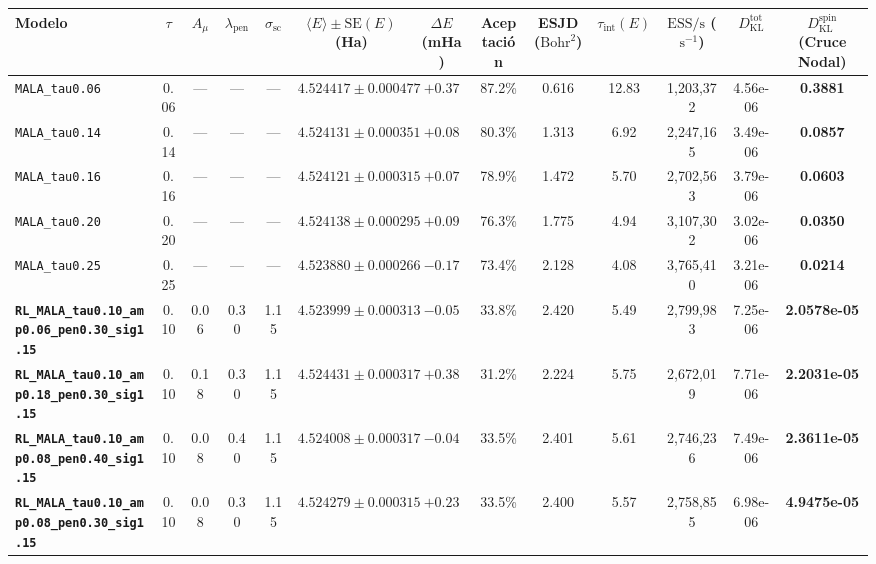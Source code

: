 \documentclass[10pt,a4paper]{article}
\begin{document}
\begin{table}[H]
\centering
\begin{adjustbox}{max width=\textwidth}
\begin{tabular}{lcccccccccccc}
\toprule
\textbf{Modelo} & \textbf{$\tau$} & \textbf{$A_\mu$} & \textbf{$\lambda_{\mathrm{pen}}$} & \textbf{$\sigma_{\mathrm{sc}}$} & \textbf{$\langle E \rangle \pm \mathrm{SE}(E)$ (Ha)} & \textbf{$\Delta E$ (mHa)} & \textbf{Aceptación} & \textbf{ESJD ($\text{Bohr}^2$)} & \textbf{$\tau_{\mathrm{int}}(E)$} & \textbf{$\mathrm{ESS/s}$ ($\text{s}^{-1}$)} & \textbf{$D_{\mathrm{KL}}^{\mathrm{tot}}$} & \textbf{$D_{\mathrm{KL}}^{\mathrm{spin}}$ (Cruce Nodal)} \\
\midrule
\texttt{MALA\_tau0.06} & 0.06 & --- & --- & --- & $4.524417 \pm 0.000477$ & $+0.37$ & 87.2\% & 0.616 & 12.83 & 1,203,372 & 4.56e-06 & \textbf{0.3881} \\
\texttt{MALA\_tau0.14} & 0.14 & --- & --- & --- & $4.524131 \pm 0.000351$ & $+0.08$ & 80.3\% & 1.313 & 6.92 & 2,247,165 & 3.49e-06 & \textbf{0.0857} \\
\texttt{MALA\_tau0.16} & 0.16 & --- & --- & --- & $4.524121 \pm 0.000315$ & $+0.07$ & 78.9\% & 1.472 & 5.70 & 2,702,563 & 3.79e-06 & \textbf{0.0603} \\
\texttt{MALA\_tau0.20} & 0.20 & --- & --- & --- & $4.524138 \pm 0.000295$ & $+0.09$ & 76.3\% & 1.775 & 4.94 & 3,107,302 & 3.02e-06 & \textbf{0.0350} \\
\texttt{MALA\_tau0.25} & 0.25 & --- & --- & --- & $4.523880 \pm 0.000266$ & $-0.17$ & 73.4\% & 2.128 & 4.08 & 3,765,410 & 3.21e-06 & \textbf{0.0214} \\
\textbf{\texttt{RL\_MALA\_tau0.10\_amp0.06\_pen0.30\_sig1.15}} & 0.10 & 0.06 & 0.30 & 1.15 & $4.523999 \pm 0.000313$ & $-0.05$ & 33.8\% & 2.420 & 5.49 & 2,799,983 & 7.25e-06 & \textbf{2.0578e-05} \\
\textbf{\texttt{RL\_MALA\_tau0.10\_amp0.18\_pen0.30\_sig1.15}} & 0.10 & 0.18 & 0.30 & 1.15 & $4.524431 \pm 0.000317$ & $+0.38$ & 31.2\% & 2.224 & 5.75 & 2,672,019 & 7.71e-06 & \textbf{2.2031e-05} \\
\textbf{\texttt{RL\_MALA\_tau0.10\_amp0.08\_pen0.40\_sig1.15}} & 0.10 & 0.08 & 0.40 & 1.15 & $4.524008 \pm 0.000317$ & $-0.04$ & 33.5\% & 2.401 & 5.61 & 2,746,236 & 7.49e-06 & \textbf{2.3611e-05} \\
\textbf{\texttt{RL\_MALA\_tau0.10\_amp0.08\_pen0.30\_sig1.15}} & 0.10 & 0.08 & 0.30 & 1.15 & $4.524279 \pm 0.000315$ & $+0.23$ & 33.5\% & 2.400 & 5.57 & 2,758,855 & 6.98e-06 & \textbf{4.9475e-05} \\

\end{tabular}
\end{adjustbox}
\end{table}
\end{document}
